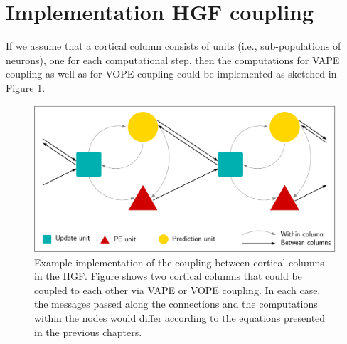 \section{Implementation HGF coupling}

If we assume that a cortical column consists of units (i.e., sub-populations of neurons), one for each computational step, then the computations for \textsf{VAPE coupling} as well as for \textsf{VOPE coupling} could be implemented as sketched in Figure 1.

\begin{figure}[h]
	\includegraphics[width = \textwidth]{figures/impl/fig.jpeg}
	\caption{Example implementation of the coupling between cortical columns in the HGF. Figure shows two cortical columns that could be coupled to each other via VAPE or VOPE coupling. In each case, the messages passed along the connections and the computations within the nodes would differ according to the equations presented in the previous chapters.}
\end{figure}

